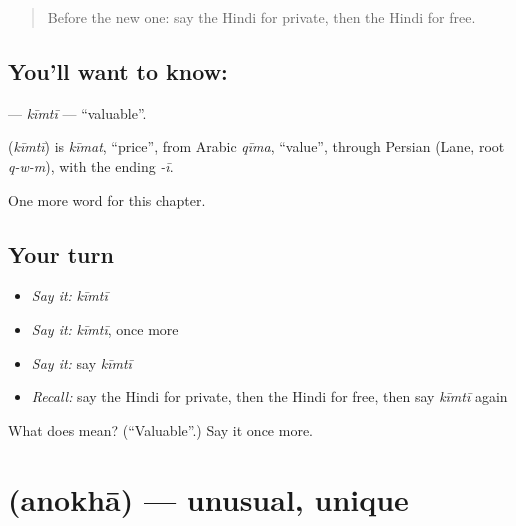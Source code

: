 \label{lesson:HI-C241-kimti}



\begin{quote}
Before the new one: say the Hindi for private, then the Hindi for free.
\end{quote}

\subsection*{You'll want to know: }
\textbf{} — \emph{kīmtī} — \textquotedblleft{}valuable\textquotedblright{}.

\begin{cousinweb}
\textbf{} (\emph{kīmtī}) is \emph{kīmat}, \textquotedblleft{}price\textquotedblright{}, from Arabic \emph{qīma}, \textquotedblleft{}value\textquotedblright{}, through Persian (Lane, root \emph{q-w-m}), with the ending \emph{-ī}.
\end{cousinweb}

\begin{grammarlens}[title={What you've built}]
One more word for this chapter.
\end{grammarlens}

\subsection*{Your turn}
\begin{itemize}
\raggedright
  \item \emph{Say it:} \emph{kīmtī}
  \item \emph{Say it:} \emph{kīmtī}, once more
  \item \emph{Say it:} say \emph{kīmtī}
  \item \emph{Recall:} say the Hindi for private, then the Hindi for free, then say \emph{kīmtī} again
\end{itemize}

\begin{tcolorbox}[breakable,colback=teal!4,colframe=teal!35!black,title={Before you move on}]
What does  mean? (\textquotedblleft{}Valuable\textquotedblright{}.) Say it once more.
\end{tcolorbox}
\section[\texorpdfstring{\hi{अनोखा} (anokhā)}{अनोखा (anokhā)}]{ (anokhā) — unusual, unique}

